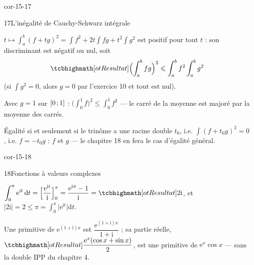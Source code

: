 \begin{blocLivre}{cor-15-17}
\begin{corrige}{17}{L'inégalité de Cauchy-Schwarz intégrale}
\begin{questions}
  \item $t\mapsto\displaystyle\int_{a}^{b}(f+tg)^{2}
    =\int f^{2}+2t\int fg+t^{2}\int g^{2}$ est positif pour tout $t$ : son
    discriminant est négatif ou nul, soit
    \[
    \res{\Bigl(\int_{a}^{b}fg\Bigr)^{2}
    \leqslant\int_{a}^{b}f^{2}\int_{a}^{b}g^{2}}
    \]
    (si $\int g^{2}=0$, alors $g=0$ par l'exercice 10 et tout est nul).
  \item Avec $g=1$ sur $\mathopen{[}0\,{;}\,1\mathclose{]}$ :
    $\bigl(\int_{0}^{1}f\bigr)^{2}\leqslant\int_{0}^{1}f^{2}$ — le carré
    de la moyenne est majoré par la moyenne des carrés.
  \item Égalité si et seulement si le trinôme a une racine double $t_0$,
    i.e. $\int(f+t_0g)^{2}=0$, i.e. $f=-t_0g$ : $f$ et $g$
     — le chapitre 18 en fera le cas d'égalité
    général.
\end{questions}
\end{corrige}
\end{blocLivre}

\begin{blocLivre}{cor-15-18}
\begin{corrige}{18}{Fonctions à valeurs complexes}
\begin{questions}
  \item $\displaystyle\int_{0}^{\pi}\mathrm{e}^{\mathrm{i}t}\,\mathrm{d}t
    =\Bigl[\frac{\mathrm{e}^{\mathrm{i}t}}{\mathrm{i}}\Bigr]_{0}^{\pi}
    =\frac{\mathrm{e}^{\mathrm{i}\pi}-1}{\mathrm{i}}=\res{2\mathrm{i}}$,
    et $|2\mathrm{i}|=2\leqslant\pi
    =\displaystyle\int_{0}^{\pi}\bigl|\mathrm{e}^{\mathrm{i}t}\bigr|\mathrm{d}t$.
  \item Une primitive de $\mathrm{e}^{(1+\mathrm{i})x}$ est
    $\dfrac{\mathrm{e}^{(1+\mathrm{i})x}}{1+\mathrm{i}}$ ; sa partie
    réelle,
    $\res{\dfrac{\mathrm{e}^{x}(\cos x+\sin x)}{2}}$, est une primitive de
    $\mathrm{e}^{x}\cos x$ — sans la double IPP du chapitre 4.
\end{questions}
\end{corrige}
\end{blocLivre}

